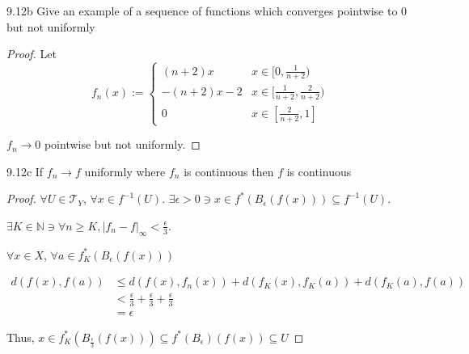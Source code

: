 \documentclass{article}
\newcommand*{\T}{\mathcal{T}}
\newcommand*{\subeq}{\subseteq}
\newcommand{\N}{\mathbb{N}}
\newcommand{\abs}[1]{\left\lvert #1\right\rvert}
\begin{document}
\begin{PROB}{9.12b}\label{Problem 9.12b.}
    Give an example of a sequence of functions which converges pointwise to $0$ but not uniformly 
\end{PROB}
\begin{proof}
    Let \[
    f_n(x) := \begin{cases}
        (n + 2)x & x \in [0, \frac{1}{n+2}) \\
        -(n + 2)x - 2 & x \in [\frac{1}{n + 2}, \frac{2}{n + 2}) \\
        0 & x \in [\frac{2}{n + 2}, 1]
    \end{cases}
    \]

    $f_n \to 0$ pointwise but not uniformly.  
\end{proof}

\begin{claim}{9.12c}\label{Claim 9.12c.}
    If $f_n \to f$ uniformly where $f_n$ is continuous then $f$ is continuous    
\end{claim}
\begin{proof}

    $\forall U \in \T_Y$, $\forall x \in f^{-1}(U)$.  $\exists \epsilon > 0 \ni x \in f^*(B_\epsilon(f(x))) \subeq f^{-1}(U)$. 
    
    $\exists K \in \N \ni \forall n
    \geq K, \abs{f_n - f}_{\infty} < \frac{\epsilon}{3}$.
    
    $\forall x \in X$, $\forall a \in f_K^*(B_{\epsilon}(f(x)))$  

    \begin{align*}
        d(f(x), f(a)) &\leq d(f(x), f_n(x)) + d(f_K(x), f_K(a)) + d(f_K(a), f(a)) \\
        &< \frac{\epsilon}{3} + \frac{\epsilon}{3} + \frac{\epsilon}{3} \\
        &= \epsilon
    \end{align*}

    Thus, $x \in f_K^*(B_{\frac{\epsilon}{3}}(f(x))) \subeq f^*(B_\epsilon)(f(x)) \subeq U$ 
\end{proof}

\bigskip
\end{document}
